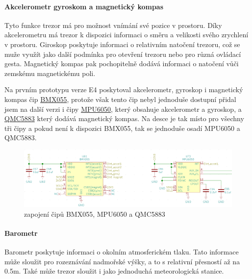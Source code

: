 \paragraph{Akcelerometr gyroskom a magnetický kompas}
Tyto funkce trezor má pro možnost vnímání své pozice v prostoru. 
Díky akcelerometru má trezor k dispozici informaci o směru a velikosti svého zrychlení v prostoru.
Giroskop poskytuje informaci o relativním natočení trezoru, což se muže využít jako další podmínka pro otevření trezoru nebo pro různá ovládací gesta.
Magnetický kompas pak pochopitelně dodává informaci o natočení vůči zemskému magnetickému poli.

Na prvním prototypu verze E4 poskytoval akcelerometr, gyroskop i magnetický kompas čip \href{https://datasheet.lcsc.com/szlcsc/Bosch-Sensortec-BMX055_C94022.pdf}{BMX055}, 
protože však tento čip nebyl jednoduše dostupní přidal jsem na další verzi i čipy \href{https://datasheet.lcsc.com/szlcsc/TDK-InvenSense-MPU-6050_C24112.pdf}{MPU6050},
který obsahuje akcelerometr a gyroskop, a \href{https://datasheet.lcsc.com/szlcsc/QST-QMC5883L-TR_C192585.pdf}{QMC5883} který dodává magnetický kompas.
Na desce je tak místo pro všechny tři čipy a pokud není k dispozici BMX055, tak se jednoduše osadí MPU6050 a QMC5883. 

\begin{figure}[htbp]
    \centering
    \includegraphics[width=\textwidth]{kapitoly/obrazky/E4/vnimani/BMX-MPU.png}
    \caption{zapojení čipů BMX055, MPU6050 a QMC5883}
    \label{fig:E4-9axis}
\end{figure}

\newpage

\paragraph{Barometr}
Barometr poskytuje informaci o okolním atmosferickém tlaku. Tato informace může sloužit pro rozeznávání nadmořské výšky, a to s relativní přesností až na 0.5m. Také může trezor sloužit 
i jako jednoduchá meteorologická stanice.

